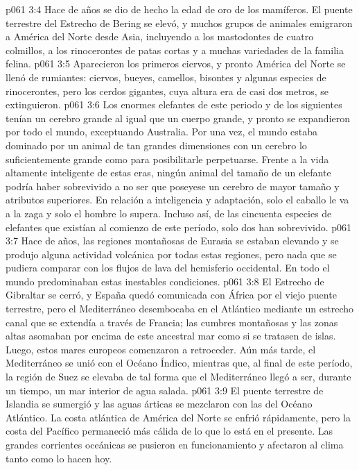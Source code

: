 \vs p061 3:4 \pc Hace  de años se dio de hecho la edad de oro de los mamíferos. El puente terrestre del Estrecho de Bering se elevó, y muchos grupos de animales emigraron a América del Norte desde Asia, incluyendo a los mastodontes de cuatro colmillos, a los rinocerontes de patas cortas y a muchas variedades de la familia felina.
\vs p061 3:5 Aparecieron los primeros ciervos, y pronto América del Norte se llenó de rumiantes: ciervos, bueyes, camellos, bisontes y algunas especies de rinocerontes, pero los cerdos gigantes, cuya altura era de casi dos metros, se extinguieron.
\vs p061 3:6 Los enormes elefantes de este periodo y de los siguientes tenían un cerebro grande al igual que un cuerpo grande, y pronto se expandieron por todo el mundo, exceptuando Australia. Por una vez, el mundo estaba dominado por un animal de tan grandes dimensiones con un cerebro lo suficientemente grande como para posibilitarle perpetuarse. Frente a la vida altamente inteligente de estas eras, ningún animal del tamaño de un elefante podría haber sobrevivido a no ser que poseyese un cerebro de mayor tamaño y atributos superiores. En relación a inteligencia y adaptación, solo el caballo le va a la zaga y solo el hombre lo supera. Incluso así, de las cincuenta especies de elefantes que existían al comienzo de este período, solo dos han sobrevivido.
\vs p061 3:7 \pc Hace  de años, las regiones montañosas de Eurasia se estaban elevando y se produjo alguna actividad volcánica por todas estas regiones, pero nada que se pudiera comparar con los flujos de lava del hemisferio occidental. En todo el mundo predominaban estas inestables condiciones.
\vs p061 3:8 El Estrecho de Gibraltar se cerró, y España quedó comunicada con África por el viejo puente terrestre, pero el Mediterráneo desembocaba en el Atlántico mediante un estrecho canal que se extendía a través de Francia; las cumbres montañosas y las zonas altas asomaban por encima de este ancestral mar como si se tratasen de islas. Luego, estos mares europeos comenzaron a retroceder. Aún más tarde, el Mediterráneo se unió con el Océano Índico, mientras que, al final de este período, la región de Suez se elevaba de tal forma que el Mediterráneo llegó a ser, durante un tiempo, un mar interior de agua salada.
\vs p061 3:9 El puente terrestre de Islandia se sumergió y las aguas árticas se mezclaron con las del Océano Atlántico. La costa atlántica de América del Norte se enfrió rápidamente, pero la costa del Pacífico permaneció más cálida de lo que lo está en el presente. Las grandes corrientes oceánicas se pusieron en funcionamiento y afectaron al clima tanto como lo hacen hoy.
